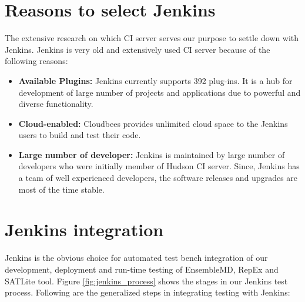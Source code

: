 \documentclass[10pt]{ruthesis}
\begin{document}

\section{Reasons to select Jenkins}
The extensive research on which CI server serves our purpose to settle down with Jenkins. Jenkins is very old and extensively used CI server because of the following reasons:

\begin{itemize}
\item \textbf{Available Plugins:} Jenkins currently supports 392 plug-ins. It is a hub for development of large number of projects and applications due to powerful and diverse functionality.

\item \textbf{Cloud-enabled:} Cloudbees provides unlimited cloud space to the Jenkins users to build and test their code.

\item \textbf{Large number of developer:} Jenkins is maintained by large number of developers who were initially member of Hudson CI server. Since, Jenkins has a team of well experienced developers, the software releases and upgrades are most of the time stable.
\end{itemize}

\section{Jenkins integration}
Jenkins is the obvious choice for automated test bench integration of our development, deployment and run-time testing of EnsembleMD, RepEx and SATLite tool. Figure \ref{fig:jenkins_process} shows the stages in our Jenkins test process. Following are the generalized steps in integrating testing with Jenkins:
\end{document}
